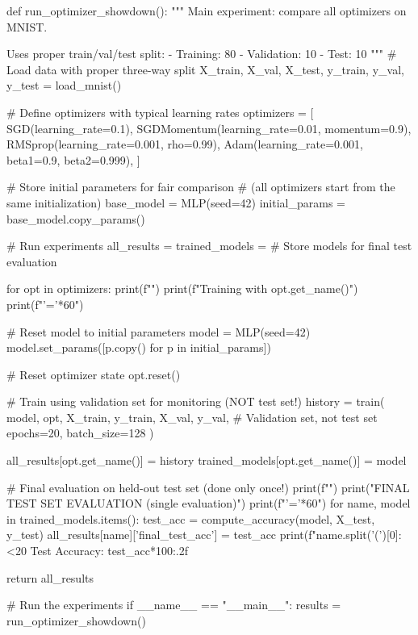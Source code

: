 \documentclass[../../main.tex]{subfiles}
\begin{document}
\begin{pythoncode}
def run_optimizer_showdown():
    """
    Main experiment: compare all optimizers on MNIST.

    Uses proper train/val/test split:
    - Training: 80%
    - Validation: 10%
    - Test: 10%
    """
    # Load data with proper three-way split
    X_train, X_val, X_test, y_train, y_val, y_test = load_mnist()

    # Define optimizers with typical learning rates
    optimizers = [
        SGD(learning_rate=0.1),
        SGDMomentum(learning_rate=0.01, momentum=0.9),
        RMSprop(learning_rate=0.001, rho=0.99),
        Adam(learning_rate=0.001, beta1=0.9, beta2=0.999),
    ]

    # Store initial parameters for fair comparison
    # (all optimizers start from the same initialization)
    base_model = MLP(seed=42)
    initial_params = base_model.copy_params()

    # Run experiments
    all_results = {}
    trained_models = {}  # Store models for final test evaluation

    for opt in optimizers:
        print(f"")
        print(f"Training with {opt.get_name()}")
        print(f"{'='*60}")

        # Reset model to initial parameters
        model = MLP(seed=42)
        model.set_params([p.copy() for p in initial_params])

        # Reset optimizer state
        opt.reset()

        # Train using validation set for monitoring (NOT test set!)
        history = train(
            model, opt,
            X_train, y_train,
            X_val, y_val,  # Validation set, not test set
            epochs=20,
            batch_size=128
        )

        all_results[opt.get_name()] = history
        trained_models[opt.get_name()] = model

    # Final evaluation on held-out test set (done only once!)
    print(f"")
    print("FINAL TEST SET EVALUATION (single evaluation)")
    print(f"{'='*60}")
    for name, model in trained_models.items():
        test_acc = compute_accuracy(model, X_test, y_test)
        all_results[name]['final_test_acc'] = test_acc
        print(f"{name.split('(')[0]:<20} Test Accuracy: {test_acc*100:.2f}%

    return all_results


# Run the experiments
if __name__ == "__main__":
    results = run_optimizer_showdown()
\end{pythoncode}
\end{document}
